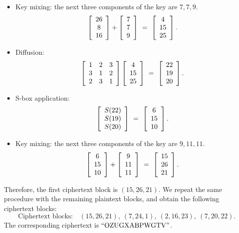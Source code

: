 \documentclass{ximera}
\begin{document}
\begin{solution}
  \begin{itemize}
  \item Key mixing: the next three components of the key are
    $7,7,9$.
    \begin{equation*}
      \startmat{c} 26 \\ 8 \\ 16 \stopmat
      +
      \startmat{c} 7 \\ 7 \\ 9 \stopmat
      ~=~
      \startmat{c} 4 \\ 15 \\ 25 \stopmat.
    \end{equation*}
  \item Diffusion:
    \begin{equation*}
      \startmat{ccc}
        1 & 2 & 3 \\
        3 & 1 & 2 \\
        2 & 3 & 1 \\
      \stopmat
      \startmat{c} 4 \\ 15 \\ 25 \stopmat
      ~=~
      \startmat{c} 22 \\ 19 \\ 20 \stopmat.
    \end{equation*}
  \item S-box application:
    \begin{equation*}
      \startmat{c} S(22) \\ S(19) \\ S(20) \stopmat
      ~=~
      \startmat{c} 6 \\ 15 \\ 10 \stopmat.
    \end{equation*}
  \end{itemize}

  \begin{itemize}
  \item Key mixing: the next three components of the key are
    $9,11,11$.
    \begin{equation*}
      \startmat{c} 6 \\ 15 \\ 10 \stopmat
      +
      \startmat{c} 9 \\ 11 \\ 11 \stopmat
      ~=~
      \startmat{c} 15 \\ 26 \\ 21 \stopmat.
    \end{equation*}
  \end{itemize}
  Therefore, the first ciphertext block is $(15,26,21)$. We repeat the
  same procedure with the remaining plaintext blocks, and obtain the
  following ciphertext blocks:
  \begin{equation*}
    \mbox{Ciphertext blocks:}\quad
    (15,26,21),\
    (7,24,1),\
    (2,16,23),\
    (7,20,22).
  \end{equation*}
  The corresponding ciphertext is $\q{OZUGXABPWGTV}$.
\end{solution}
\end{document}
